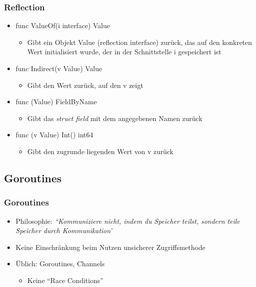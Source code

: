 \documentclass{beamer}
\begin{document}
\begin{frame}
\frametitle{Reflection}

\begin{itemize}
\setlength{\itemsep}{24pt}
\item func ValueOf(i interface{}) Value
\begin{itemize}
\item Gibt ein Objekt Value (reflection interface) zurück, das auf den konkreten Wert initialisiert wurde, der in der Schnittstelle i gespeichert ist
\end{itemize}
\item func Indirect(v Value) Value
\begin{itemize}
\item Gibt den Wert zurück, auf den v zeigt
\end{itemize}
\item func (Value) FieldByName
\begin{itemize}
\item Gibt das \textit{struct field} mit dem angegebenen Namen zur\"uck
\end{itemize}
\item func (v Value) Int() int64
\begin{itemize}
\item Gibt den zugrunde liegenden Wert von v zur\"uck
\end{itemize}
\end{itemize}

\end{frame}


\subsection{Goroutines}

\begin{frame}
\frametitle{Goroutines}

\begin{itemize}
\setlength{\itemsep}{24pt}
\item Philosophie: \textit{``Kommuniziere nicht, indem du Speicher teilst, sondern teile Speicher durch Kommunikation'}
\item Keine Einschr\"ankung beim Nutzen unsicherer Zugriffsmethode
\item \"Ublich: Goroutines, Channels
\begin{itemize}
\item Keine ``Race Conditions''
\end{itemize}
\end{itemize}

\end{frame}
\end{document}
